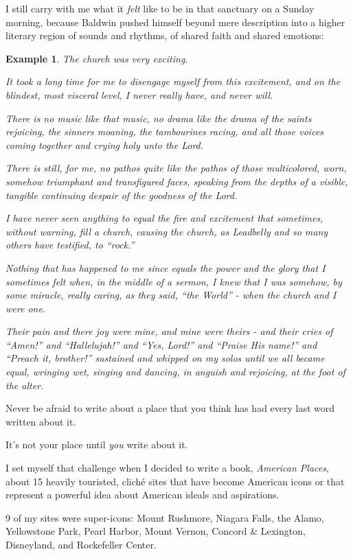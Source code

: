 \documentclass{book}
\numberwithin{equation}{section}
\newtheorem{example}{Example}[chapter]
\begin{document}
I still carry with me what it \textit{felt} like to be in that sanctuary on a Sunday morning, because Baldwin pushed himself beyond mere description into a higher literary region of sounds and rhythms, of shared faith and shared emotions:
\begin{example}
    The church was very exciting.
    
    It took a long time for me to disengage myself from this excitement, and on the blindest, most visceral level, I never really have, and never will.
    
    There is no music like that music, no drama like the drama of the saints rejoicing, the sinners moaning, the tambourines racing, and all those voices coming together and crying holy unto the Lord.
    
    There is still, for me, no pathos quite like the pathos of those multicolored, worn, somehow triumphant and transfigured faces, speaking from the depths of a visible, tangible continuing despair of the goodness of the Lord.
    
    I have never seen anything to equal the fire and excitement that sometimes, without warning, fill a church, causing the church, as Leadbelly and so many others have testified, to ``rock.''
    
    Nothing that has happened to me since equals the power and the glory that I sometimes felt when, in the middle of a sermon, I knew that I was somehow, by some miracle, really caring, as they said, ``the World'' - when the church and I were one.
    
    Their pain and there joy were mine, and mine were theirs - and their cries of ``Amen!'' and ``Hallelujah!'' and ``Yes, Lord!'' and ``Praise His name!'' and ``Preach it, brother!'' sustained and whipped on my solos until we all became equal, wringing wet, singing and dancing, in anguish and rejoicing, at the foot of the alter.
\end{example}
Never be afraid to write about a place that you think has had every last word written about it.

It's not your place until \textit{you} write about it.

I set myself that challenge when I decided to write a book, \textit{American Places}, about 15 heavily touristed, clich\'e sites that have become American icons or that represent a powerful idea about American ideals and aspirations.

%
9 of my sites were super-icons: Mount Rushmore, Niagara Falls, the Alamo, Yellowstone Park, Pearl Harbor, Mount Vernon, Concord \& Lexington, Disneyland, and Rockefeller Center.
\end{document}
